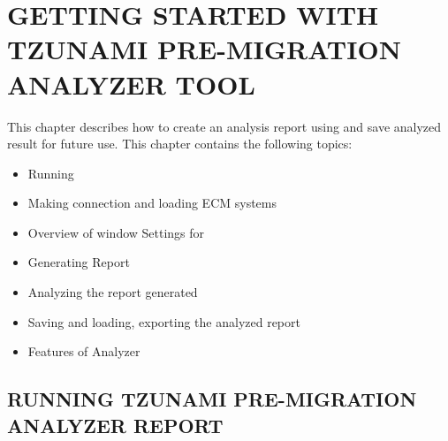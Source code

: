 \chapter{GETTING STARTED WITH TZUNAMI PRE-MIGRATION ANALYZER TOOL}
This chapter describes how to create an analysis report using \appName and save analyzed result for future use. This chapter contains the following topics:
\begin{itemize}
  \item Running \appName
  \item Making connection and loading ECM systems
  \item Overview of \appName window Settings for \appName
  \item Generating Report
  \item Analyzing the report generated
  \item Saving and loading, exporting the analyzed report
  \item Features of Analyzer
\end{itemize}
 \section{RUNNING TZUNAMI PRE-MIGRATION ANALYZER REPORT}


